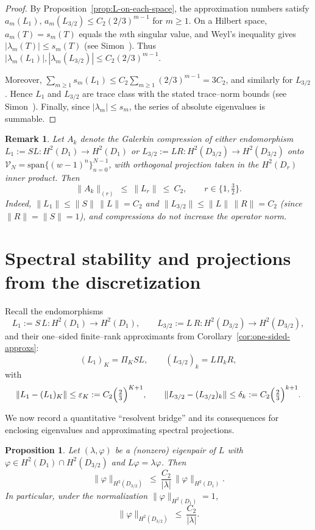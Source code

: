 \documentclass[11pt]{article}
\newtheorem{remark}[definition]{Remark}
\newtheorem{proposition}[definition]{Proposition}
\begin{document}
\begin{proof}
By Proposition~\ref{prop:L-on-each-space}, the approximation numbers satisfy
$a_m(L_{1}),\,a_m(L_{3/2})\le C_2(2/3)^{m-1}$ for $m\ge1$. On a Hilbert space,
$a_m(T)=s_m(T)$ equals the $m$th singular value, and Weyl’s inequality gives
$|\lambda_m(T)|\le s_m(T)$ (see Simon~\cite[Thm.~1.33]{Simon05}). Thus
$|\lambda_m(L_{1})|,|\lambda_m(L_{3/2})|\le C_2(2/3)^{m-1}$.

Moreover, $\sum_{m\ge1}s_m(L_{1})\le C_2\sum_{m\ge1}(2/3)^{m-1}=3C_2$, and similarly for
$L_{3/2}$. Hence $L_{1}$ and $L_{3/2}$ are trace class with the stated trace–norm bounds
(see Simon~\cite[Thm.~1.35]{Simon05}). Finally, since $|\lambda_m|\le s_m$, the series of
absolute eigenvalues is summable.
\end{proof}

\begin{remark}
\label{rem:Ak-norms}
Let $A_k$ denote the Galerkin compression of either endomorphism
$L_1:=SL:H^2(D_1)\to H^2(D_1)$ or $L_{3/2}:=LR:H^2(D_{3/2})\to H^2(D_{3/2})$
onto $\mathcal V_N=\mathrm{span}\{(w-1)^n\}_{n=0}^{N-1}$, with orthogonal
projection taken in the $H^2(D_r)$ inner product. Then
\[
\|A_k\|_{(r)}\ \le\ \|L_r\|\ \le\ C_2,\qquad r\in\{1,\tfrac32\}.
\]
Indeed, $\|L_1\|\le\|S\|\,\|L\|=C_2$ and $\|L_{3/2}\|\le\|L\|\,\|R\|=C_2$
(since $\|R\|=\|S\|=1$), and compressions do not increase the operator norm.
\end{remark}

\section{Spectral stability and projections from the discretization}
\label{sec:spectral-stability}

Recall the endomorphisms
\[
L_{1}:=S\,L:H^2(D_1)\to H^2(D_1),
\qquad
L_{3/2}:=L\,R:H^2(D_{3/2})\to H^2(D_{3/2}),
\]
and their one–sided finite–rank approximants from Corollary~\ref{cor:one-sided-approxs}:
\[
(L_{1})_{K}=\Pi_{K} S L,\qquad
(L_{3/2})_{k}=L \Pi_{k} R,
\]
with
\[
\|L_{1}-(L_{1})_{K}\| \le \varepsilon_{K}:=C_2\Bigl(\tfrac{2}{3}\Bigr)^{K+1},
\qquad
\|L_{3/2}-(L_{3/2})_{k}\| \le \delta_{k}:=C_2\Bigl(\tfrac{2}{3}\Bigr)^{k+1}.
\]

We now record a quantitative ``resolvent bridge'' and its consequences for enclosing
eigenvalues and approximating spectral projections.

\begin{proposition}\label{prop:ev-norm-bound}
Let $(\lambda,\varphi)$ be a (nonzero) eigenpair of $L$ with
$\varphi\in H^2(D_1)\cap H^2(D_{3/2})$ and $L\varphi=\lambda\varphi$.
Then
\[
\boxed{\qquad
\|\varphi\|_{H^2(D_{3/2})}
\ \le\ \frac{C_2}{|\lambda|}\,\|\varphi\|_{H^2(D_1)}.
\qquad}
\]
In particular, under the normalization $\|\varphi\|_{H^2(D_1)}=1$,
\[
\|\varphi\|_{H^2(D_{3/2})}\ \le\ \frac{C_2}{|\lambda|}.
\]
\end{proposition}
\end{document}
